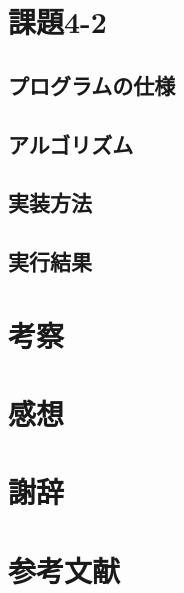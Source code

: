 \documentclass[dvipdfmx]{jarticle}
\begin{document}
\section{課題4-2}
\subsection{プログラムの仕様}
\subsection{アルゴリズム}
\subsection{実装方法}
\subsection{実行結果}
\section{考察}
\section{感想}
\section{謝辞}
\section{参考文献}
\end{document}
